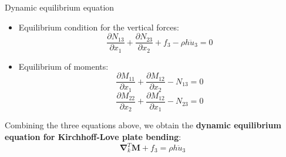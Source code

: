 \documentclass[aspectratio=169]{beamer}
\begin{document}
\begin{frame}{Dynamic equilibrium equation}
  \begin{itemize}
    \item Equilibrium condition for the vertical forces:
          $$\frac{\partial N_{13}}{\partial x_1}+\frac{\partial N_{23}}{\partial x_2}+f_3-\rho h \ddot{u}_3=0$$
    \item Equilibrium of moments:
          $$\frac{\partial M_{11}}{\partial x_1}+\frac{\partial M_{12}}{\partial x_2}-N_{13}=0$$
          $$\frac{\partial M_{22}}{\partial x_2}+\frac{\partial M_{12}}{\partial x_1}-N_{23}=0$$
  \end{itemize}
  \begin{tcolorbox}[colback=darkred!10,colframe=darkred!40!black]
    Combining the three equations above, we obtain the \textbf{dynamic equilibrium equation for Kirchhoff-Love plate bending}:
    $$\boldsymbol{\nabla}_k^T \mathbf M+f_3=\rho h \ddot{u}_3$$
  \end{tcolorbox}
\end{frame}
\end{document}
